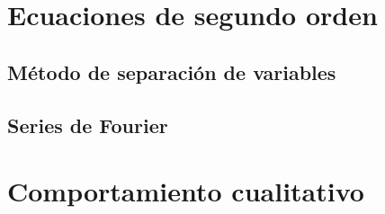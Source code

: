 \documentclass[palatino]{apuntes}
\begin{document}
\chapter{Ecuaciones de segundo orden}
\label{chap:EcuacionesSegundoOrden}

\section{Método de separación de variables}

\section{Series de Fourier}

\chapter{Comportamiento cualitativo}

\appendix

{}
\printindex
\end{document}
